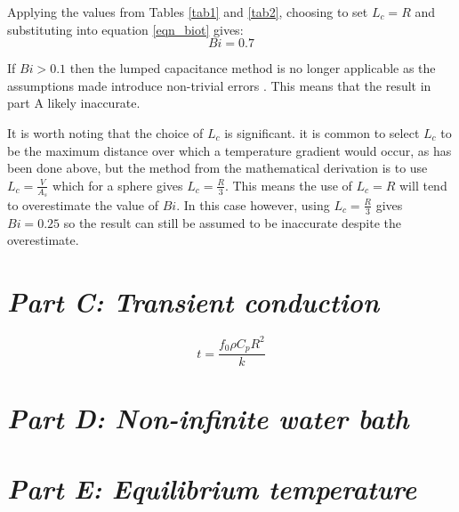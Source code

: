 \documentclass[11pt]{article}
\begin{document}
Applying the values from Tables \ref{tab1} and \ref{tab2}, choosing to set $L_{c}=R$ and substituting into equation \ref{eqn_biot} gives:
\begin{equation}\label{key}
	Bi = 0.7
\end{equation}

If $Bi > 0.1$ then the lumped capacitance method is no longer applicable as the assumptions made introduce non-trivial errors \cite{bergman_fundamentals_2011}. This means that the result in part A likely inaccurate.

It is worth noting that the choice of $L_c$ is significant. it is common to select $L_c$ to be the maximum distance over which a temperature gradient would occur, as has been done above, but the method from the mathematical derivation is to use $L_c = \frac{V}{A_s}$ which for a sphere gives $L_c = \frac{R}{3}$. This means the use of $L_c = R$ will tend to overestimate the value of $Bi$. In this case however, using $L_c = \frac{R}{3}$ gives $Bi = 0.25$ so the result can still be assumed to be inaccurate despite the overestimate.

\section{\emph{Part C: Transient conduction}}
\begin{equation}
	t=\frac{f_{0} \rho C_{p} R^{2}}{k}
\end{equation}
\section{\emph{Part D: Non-infinite water bath}}

\section{\emph{Part E: Equilibrium temperature}}



\end{document}
